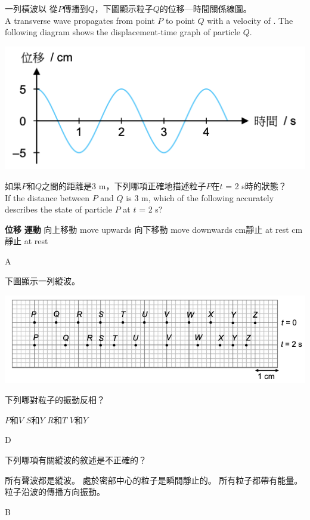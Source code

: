 {
    一列橫波以  從$P$傳播到$Q$，下圖顯示粒子$Q$的位移—時間關係線圖。
    \\A transverse wave propagates from point $P$ to point $Q$ with a velocity of . The following diagram shows the displacement-time graph of particle $Q$.
    \par{\par\centering\includegraphics[width=.45\textwidth]{./img/ch1_earlyclass_wave_mc_2024-05-13-16-13-07.png}\par}
    如果$P$和$Q$之間的距離是3 m，下列哪項正確地描述粒子$P$在$t$ = 2 s時的狀態？
    \\If the distance between $P$ and $Q$ is 3 m, which of the following accurately describes the state of particle $P$ at $t$ = 2 s?
    \begin{tasks}
        \task [] \textbf{位移} \tab\tab \textbf{運動}
        \tab\tab 向上移動 move upwards
        \tab\tab 向下移動 move downwards
         cm\tab\tab 靜止 at rest
         cm \tab\tab 靜止 at rest
    \end{tasks}
}{A}

{
    下圖顯示一列縱波。
    \par{\par\centering\includegraphics[width=.6\textwidth]{./img/ch1_earlyclass_wave_mc_2024-05-13-16-15-20.png}\par}
    下列哪對粒子的振動反相？
    \begin{tasks}
        \task $P$和$V$
        \task $S$和$Y$
        \task $R$和$T$
        \task $V$和$Y$
    \end{tasks}

}{D}

{
    下列哪項有關縱波的敘述是不正確的？
    \begin{tasks}
        \task 所有聲波都是縱波。
        \task 處於密部中心的粒子是瞬間靜止的。
        \task 所有粒子都帶有能量。
        \task 粒子沿波的傳播方向振動。
    \end{tasks}

}{B}


